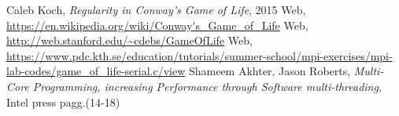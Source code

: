 \documentclass[a4paper,11pt,twoside]{report}
\begin{document}
\begin{thebibliography}{9}
	 Caleb Koch, \emph{Regularity in Conway's Game of Life}, 2015
 Web, \url{https://en.wikipedia.org/wiki/Conway's_Game_of_Life}
 Web, \url{http://web.stanford.edu/~cdebs/GameOfLife}
 Web, \url{https://www.pdc.kth.se/education/tutorials/summer-school/mpi-exercises/mpi-lab-codes/game_of_life-serial.c/view}
 Shameem Akhter, Jason Roberts, \emph{Multi-Core Programming, increasing Performance through Software multi-threading}, Intel press pagg.(14-18)
\end{thebibliography}
\end{document}

